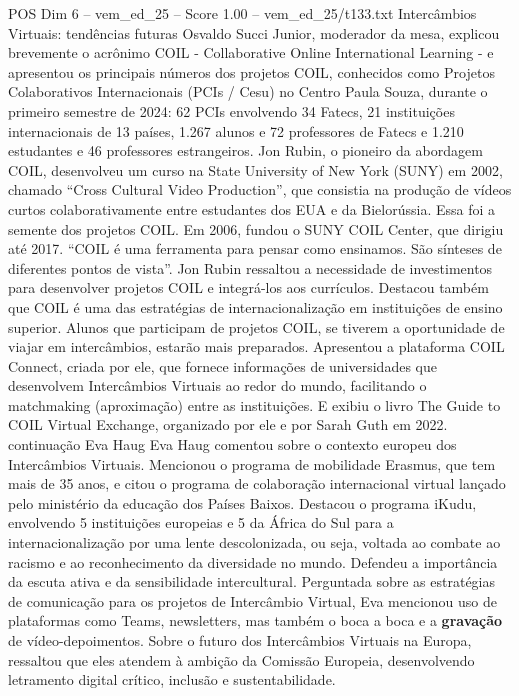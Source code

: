 \begin{textsample}{POS Dim 6 – vem\_ed\_25 – Score 1.00 – vem\_ed\_25/t133.txt}  \label{ex:f6_pos_096}
Intercâmbios Virtuais: tendências futuras Osvaldo Succi Junior, moderador da mesa, explicou brevemente o acrônimo COIL - Collaborative Online International Learning - e apresentou os principais números dos projetos COIL, conhecidos como Projetos Colaborativos Internacionais (PCIs / Cesu) no Centro Paula Souza, durante o primeiro semestre de 2024: 62 PCIs envolvendo 34 Fatecs, 21 instituições internacionais de 13 países, 1.267 alunos e 72 professores de Fatecs e 1.210 estudantes e 46 professores estrangeiros.
Jon Rubin, o pioneiro da abordagem COIL, desenvolveu um curso na State University of New York (SUNY) em 2002, chamado “Cross Cultural Video Production”, que consistia na produção de vídeos curtos colaborativamente entre estudantes dos EUA e da Bielorússia.
Essa foi a semente dos projetos COIL.
Em 2006, fundou o SUNY COIL Center, que dirigiu até 2017. “COIL é uma ferramenta para pensar como ensinamos.
São sínteses de diferentes pontos de vista”.
Jon Rubin ressaltou a necessidade de investimentos para desenvolver projetos COIL e integrá-los aos currículos.
Destacou também que COIL é uma das estratégias de internacionalização em instituições de ensino superior.
Alunos que participam de projetos COIL, se tiverem a oportunidade de viajar em intercâmbios, estarão mais preparados.
Apresentou a plataforma COIL Connect, criada por ele, que fornece informações de universidades que desenvolvem Intercâmbios Virtuais ao redor do mundo, facilitando o matchmaking (aproximação) entre as instituições.
E exibiu o livro The Guide to COIL Virtual Exchange, organizado por ele e por Sarah Guth em 2022. continuação Eva Haug Eva Haug comentou sobre o contexto europeu dos Intercâmbios Virtuais.
Mencionou o programa de mobilidade Erasmus, que tem mais de 35 anos, e citou o programa de colaboração internacional virtual lançado pelo ministério da educação dos Países Baixos.
Destacou o programa iKudu, envolvendo 5 instituições europeias e 5 da África do Sul para a internacionalização por uma lente descolonizada, ou seja, voltada ao combate ao racismo e ao reconhecimento da diversidade no mundo.
Defendeu a importância da escuta ativa e da sensibilidade intercultural.
Perguntada sobre as estratégias de comunicação para os projetos de Intercâmbio Virtual, Eva mencionou uso de plataformas como Teams, newsletters, mas também o boca a boca e a \textbf{gravação} de vídeo-depoimentos.
Sobre o futuro dos Intercâmbios Virtuais na Europa, ressaltou que eles atendem à ambição da Comissão Europeia, desenvolvendo letramento digital crítico, inclusão e sustentabilidade.

\end{textsample}
